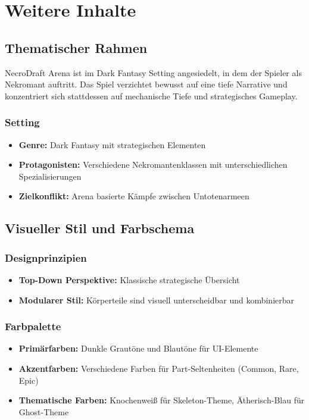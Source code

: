 \chapter{Weitere Inhalte}
\label{chap:weitere_inhalte}

\section{Thematischer Rahmen}

NecroDraft Arena ist im Dark Fantasy Setting angesiedelt, in dem der Spieler als Nekromant auftritt. 
Das Spiel verzichtet bewusst auf eine tiefe Narrative und konzentriert sich stattdessen auf mechanische Tiefe und strategisches Gameplay.

\subsection{Setting}
\begin{itemize}
    \item \textbf{Genre:} Dark Fantasy mit strategischen Elementen
    \item \textbf{Protagonisten:} Verschiedene Nekromantenklassen mit unterschiedlichen Spezialisierungen
    \item \textbf{Zielkonflikt:} Arena basierte Kämpfe zwischen Untotenarmeen
\end{itemize}

\section{Visueller Stil und Farbschema}

\subsection{Designprinzipien}
\begin{itemize}
    \item \textbf{Top-Down Perspektive:} Klassische strategische Übersicht
    \item \textbf{Modularer Stil:} Körperteile sind visuell unterscheidbar und kombinierbar
\end{itemize}

\subsection{Farbpalette}
\begin{itemize}
    \item \textbf{Primärfarben:} Dunkle Grautöne und Blautöne für UI-Elemente
    \item \textbf{Akzentfarben:} Verschiedene Farben für Part-Seltenheiten (Common, Rare, Epic)
    \item \textbf{Thematische Farben:} Knochenweiß für Skeleton-Theme, Ätherisch-Blau für Ghost-Theme
\end{itemize}


